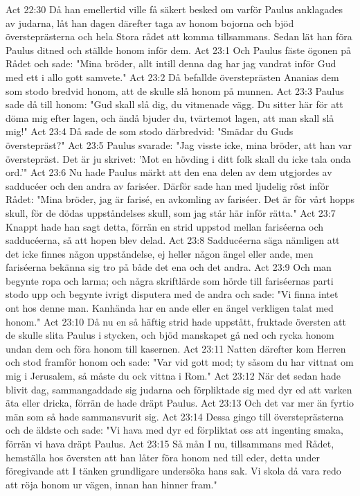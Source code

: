 Act 22:30  Då han emellertid ville få säkert besked om varför Paulus anklagades av judarna, låt han dagen därefter taga av honom bojorna och bjöd översteprästerna och hela Stora rådet att komma tillsammans. Sedan lät han föra Paulus ditned och ställde honom inför dem.
Act 23:1  Och Paulus fäste ögonen på Rådet och sade: "Mina bröder, allt intill denna dag har jag vandrat inför Gud med ett i allo gott samvete."
Act 23:2  Då befallde översteprästen Ananias dem som stodo bredvid honom, att de skulle slå honom på munnen.
Act 23:3  Paulus sade då till honom: "Gud skall slå dig, du vitmenade vägg. Du sitter här för att döma mig efter lagen, och ändå bjuder du, tvärtemot lagen, att man skall slå mig!"
Act 23:4  Då sade de som stodo därbredvid: "Smädar du Guds överstepräst?"
Act 23:5  Paulus svarade: "Jag visste icke, mina bröder, att han var överstepräst. Det är ju skrivet: 'Mot en hövding i ditt folk skall du icke tala onda ord.'"
Act 23:6  Nu hade Paulus märkt att den ena delen av dem utgjordes av sadducéer och den andra av fariséer. Därför sade han med ljudelig röst inför Rådet: "Mina bröder, jag är farisé, en avkomling av fariséer. Det är för vårt hopps skull, för de dödas uppståndelses skull, som jag står här inför rätta."
Act 23:7  Knappt hade han sagt detta, förrän en strid uppstod mellan fariséerna och sadducéerna, så att hopen blev delad.
Act 23:8  Sadducéerna säga nämligen att det icke finnes någon uppståndelse, ej heller någon ängel eller ande, men fariséerna bekänna sig tro på både det ena och det andra.
Act 23:9  Och man begynte ropa och larma; och några skriftlärde som hörde till fariséernas parti stodo upp och begynte ivrigt disputera med de andra och sade: "Vi finna intet ont hos denne man. Kanhända har en ande eller en ängel verkligen talat med honom."
Act 23:10  Då nu en så häftig strid hade uppstått, fruktade översten att de skulle slita Paulus i stycken, och bjöd manskapet gå ned och rycka honom undan dem och föra honom till kasernen.
Act 23:11  Natten därefter kom Herren och stod framför honom och sade: "Var vid gott mod; ty såsom du har vittnat om mig i Jerusalem, så måste du ock vittna i Rom."
Act 23:12  När det sedan hade blivit dag, sammangaddade sig judarna och förpliktade sig med dyr ed att varken äta eller dricka, förrän de hade dräpt Paulus.
Act 23:13  Och det var mer än fyrtio män som så hade sammansvurit sig.
Act 23:14  Dessa gingo till översteprästerna och de äldste och sade: "Vi hava med dyr ed förpliktat oss att ingenting smaka, förrän vi hava dräpt Paulus.
Act 23:15  Så mån I nu, tillsammans med Rådet, hemställa hos översten att han låter föra honom ned till eder, detta under föregivande att I tänken grundligare undersöka hans sak. Vi skola då vara redo att röja honom ur vägen, innan han hinner fram."
